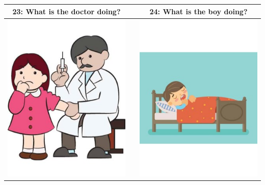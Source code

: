 \documentclass[12pt,notitlepage]{article}
\begin{document}
\begin{center}
\begin{tabular}{|c|c|c|}
\hline
23: What is the doctor doing? && 24: What is the boy doing? \\
\hline
\includegraphics[width=20em,trim=0 0 0 -3]{figures/I23.jpg} & & \includegraphics[width=20em,trim=0 0 0 -3]{figures/I24.jpg} \\
\hline
\end{tabular}
\vspace{1em} \\



\end{center}
\end{document}
